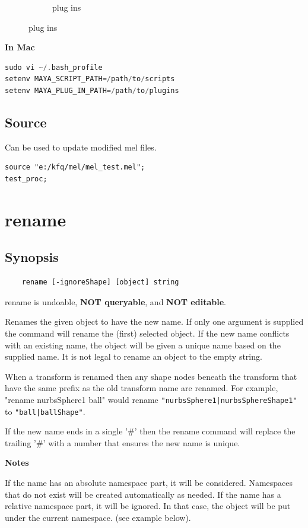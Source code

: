 \begin{figure}[tbh]
\begin{subfigure}[b]{0.45\textwidth}
		\caption{plug ins}
		\label{fig:allplugins}	
	\end{subfigure}
\end{figure}

\textbf{In Mac}

\begin{lstlisting}[language=C++]
sudo vi ~/.bash_profile
setenv MAYA_SCRIPT_PATH=/path/to/scripts
setenv MAYA_PLUG_IN_PATH=/path/to/plugins
\end{lstlisting}

\subsection{Source}
Can be used to update modified mel files.
\begin{lstlisting}
source "e:/kfq/mel/mel_test.mel";  
test_proc;  
\end{lstlisting}


\section{rename}
\subsection{Synopsis}

\begin{lstlisting}
	rename [-ignoreShape] [object] string
\end{lstlisting}

rename is undoable, \textbf{NOT queryable}, and \textbf{NOT editable}.

Renames the given object to have the new name. If only one argument is supplied the command will rename the (first) selected object. If the new name conflicts with an existing name, the object will be given a unique name based on the supplied name. It is not legal to rename an object to the empty string.


When a transform is renamed then any shape nodes beneath the transform that have the same prefix as the old transform name are renamed. For example, "rename nurbsSphere1 ball" would rename \lstinline!"nurbsSphere1|nurbsSphereShape1"! to \lstinline!"ball|ballShape"!.


If the new name ends in a single '\#' then the rename command will replace the trailing '\#' with a number that ensures the new name is unique.


\textbf{Notes}

If the name has an absolute namespace part, it will be considered. Namespaces that do not exist will be created automatically as needed. If the name has a relative namespace part, it will be ignored. In that case, the object will be put under the current namespace. (see example below).


